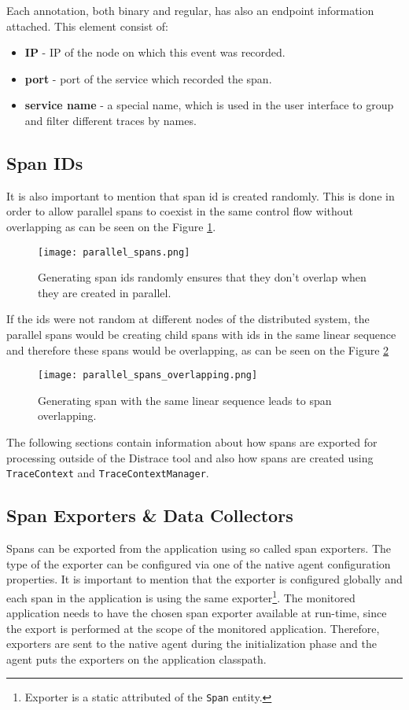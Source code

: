 Each annotation, both binary and regular, has also an endpoint information attached. This element consist of:
\begin{itemize}
	\item \textbf{IP} - IP of the node on which this event was recorded.
	\item \textbf{port} - port of the service which recorded the span.
	\item \textbf{service name} - a special name, which is used in the user interface to group and filter different traces by names.
\end{itemize}

\subsection{Span IDs}
It is also important to mention that span id is created randomly. This is done in order to allow parallel spans to coexist in the same control flow without overlapping as can be seen on the Figure \ref{fig:parallel_spans}.

	\begin{figure}
		\centering
		\texttt{[image: parallel\_spans.png]}
		\caption{Generating span ids randomly ensures that they don't overlap when they are created in parallel.}
		\label{fig:parallel_spans}
	\end{figure}
If the ids were not random at different nodes of the distributed system, the parallel spans would be creating child spans with ids in the same linear sequence and therefore these spans would be overlapping, as can be seen on the Figure \ref{fig:parallel_spans_overlapping}
	\begin{figure}
		\centering
		\texttt{[image: parallel\_spans\_overlapping.png]}
		\caption{Generating span with the same linear sequence leads to span overlapping.}
		\label{fig:parallel_spans_overlapping}
	\end{figure}
	
The following sections contain information about how spans are exported for processing outside of the Distrace tool and also how spans are created using \texttt{TraceContext} and \texttt{TraceContextManager}.
\subsection{Span Exporters \& Data Collectors}
Spans can be exported from the application using so called span exporters. The type of the exporter can be configured via one of the native agent configuration properties. It is important to mention that the exporter is configured globally and each span in the application is using the same exporter\footnote{Exporter is a static attributed of the \texttt{Span} entity.}. The monitored application needs to have the chosen span exporter available at run-time, since the export is performed at the scope of the monitored application. Therefore, exporters are sent to the native agent during the initialization phase and the agent puts the exporters on the application classpath.

